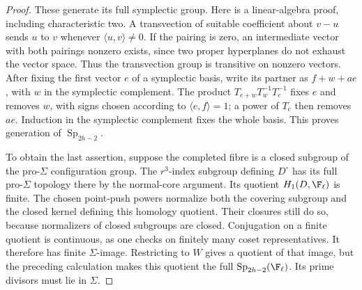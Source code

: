 \begin{proof}
These generate its full symplectic group. Here is a linear-algebra
proof, including characteristic two. A transvection of suitable
coefficient about $v-u$ sends $u$ to $v$ whenever
$\langle u,v\rangle\ne0$. If the pairing is zero, an intermediate
vector with both pairings nonzero exists, since two proper
hyperplanes do not exhaust the vector space. Thus the transvection
group is transitive on nonzero vectors. After fixing the first vector
$e$ of a symplectic basis, write its partner as $f+w+ae$, with $w$
in the symplectic complement. The product
$T_{e+w}T_w^{-1}T_e^{-1}$ fixes $e$ and removes $w$, with signs
chosen according to $\langle e,f\rangle=1$; a power of $T_e$
then removes $ae$. Induction in the symplectic complement fixes the
whole basis. This proves generation of $\operatorname{Sp}_{2h-2}$.

To obtain the last assertion, suppose the completed fibre is a
closed subgroup of the pro-$\Sigma$ configuration group. The
$r^3$-index subgroup defining $D^\circ$ has its full pro-$\Sigma$
topology there by the normal-core argument. Its quotient
$H_1(D,\F_\ell)$ is finite. The chosen point-push powers normalize
both the covering subgroup and the closed kernel defining this
homology quotient. Their closures still do so, because normalizers
of closed subgroups are closed. Conjugation on a finite quotient is
continuous, as one checks on finitely many coset representatives.
It therefore has finite $\Sigma$-image. Restricting to $W$ gives
a quotient of that image, but the preceding calculation makes this
quotient the full $\operatorname{Sp}_{2h-2}(\F_\ell)$. Its prime
divisors must lie in $\Sigma$.
\end{proof}

